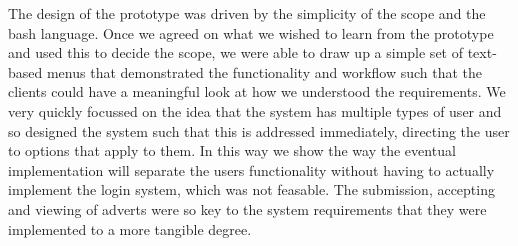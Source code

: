 The design of the prototype was driven by the simplicity of the scope and the bash language. Once we agreed on
what we wished to learn from the prototype and used this to decide the scope, we were able to draw up a simple
set of text-based menus that demonstrated the functionality and workflow such that the clients could have a 
meaningful look at how we understood the requirements. We very quickly focussed on the idea that the system has 
multiple types of user and so designed the system such that this is addressed immediately, directing the user to
options that apply to them. In this way we show the way the eventual implementation will separate the users 
functionality without having to actually implement the login system, which was not feasable. The submission, 
accepting and viewing of adverts were so key to the system requirements that they were implemented to a 
more tangible degree.